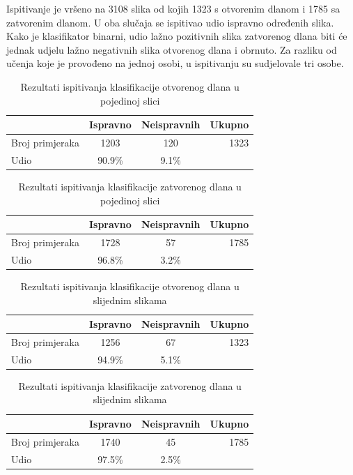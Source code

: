 \documentclass[times, utf8, diplomski, numeric]{fer}
\begin{document}
Ispitivanje je vršeno na 3108 slika od kojih 1323 s otvorenim dlanom i 1785  sa zatvorenim dlanom. U oba slučaja se ispitivao udio ispravno određenih slika. Kako je klasifikator binarni, udio lažno pozitivnih slika zatvorenog dlana biti će jednak udjelu lažno negativnih slika otvorenog dlana i obrnuto. Za razliku od učenja koje je provođeno na jednoj osobi, u ispitivanju su sudjelovale tri osobe.
\begin{table}[h!]
\centering
\begin{tabular}{ l || c c || r }
	& Ispravno  & Neispravnih &Ukupno\\\hline
	Broj primjeraka & 1203 & 120 &1323\\
	Udio&90.9\%&9.1\%
\end{tabular}
\renewcommand{\figurename}{Tablica}
	\caption{Rezultati ispitivanja klasifikacije otvorenog dlana u pojedinoj slici}
	\label{fig:single_img_open}
\end{table}
\begin{table}[h!]
\centering
\begin{tabular}{ l || c c || r }
	& Ispravno  & Neispravnih &Ukupno\\\hline
	Broj primjeraka & 1728 & 57 &1785\\
	Udio&96.8\%&3.2\%
\end{tabular}
\renewcommand{\figurename}{Tablica}
	\caption{Rezultati ispitivanja klasifikacije zatvorenog dlana u pojedinoj slici}
	\label{fig:single_img_close}
\end{table}
\begin{table}[h!]
\centering
\begin{tabular}{ l || c c || r }
	& Ispravno  & Neispravnih &Ukupno\\\hline
	Broj primjeraka & 1256 & 67 &1323\\
	Udio&94.9\%&5.1\%
\end{tabular}
\renewcommand{\figurename}{Tablica}
	\caption{Rezultati ispitivanja klasifikacije otvorenog dlana u slijednim slikama}
	\label{fig:multi_img_open}
\end{table}
\begin{table}[H]
\centering
\begin{tabular}{ l || c c || r }
	& Ispravno  & Neispravnih &Ukupno\\\hline
	Broj primjeraka & 1740 & 45 &1785\\
	Udio&97.5\%&2.5\%
\end{tabular}
\renewcommand{\figurename}{Tablica}
	\caption{Rezultati ispitivanja klasifikacije zatvorenog dlana u slijednim slikama}
	\label{fig:multi_img_close}
\end{table}
\end{document}
